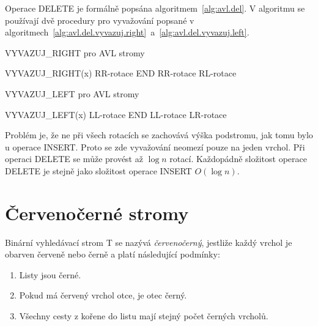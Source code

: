 Operace DELETE je formálně popsána algoritmem~\ref{alg:avl.del}.
V algoritmu se používají dvě procedury pro vyvažování popsané v
algoritmech~\ref{alg:avl.del.vyvazuj.right}~a~\ref{alg:avl.del.vyvazuj.left}.

\begin{algorithm}[!htb]
\caption{VYVAZUJ\_RIGHT pro AVL stromy}
\label{alg:avl.del.vyvazuj.right}
\begin{algorithmic}
\STATE VYVAZUJ\_RIGHT(x)
        \STATE RR-rotace
	\STATE END
\ENDIF        
		\STATE {}
        \STATE RR-rotace
\ELSE
        \STATE RL-rotace
\ENDIF
\end{algorithmic}
\end{algorithm}

\begin{algorithm}[!htb]
\caption{VYVAZUJ\_LEFT pro AVL stromy}
\label{alg:avl.del.vyvazuj.left}
\begin{algorithmic}
\STATE VYVAZUJ\_LEFT(x)
        \STATE LL-rotace
		\STATE {}
        \STATE END             
\ENDIF
{}
        \STATE LL-rotace
\ELSE
        \STATE LR-rotace
\ENDIF
\end{algorithmic}
\end{algorithm}


Problém je, že ne při všech rotacích se zachovává výška podstromu, jak
tomu bylo u operace INSERT. Proto se zde vyvažování neomezí pouze na jeden
vrchol. Při operaci DELETE se může provést až $\log n$ rotací. Každopádně
složitost operace DELETE je stejně jako složitost operace INSERT $O(\log n)$.

\FloatBarrier

\section{Červenočerné stromy}

\begin{defn}
Binární vyhledávací strom T se nazývá \emph{červenočerný}, jestliže každý 
vrchol je obarven červeně nebo černě a platí následující podmínky:
\begin{enumerate}
\item Listy jsou černé.
\item Pokud má červený vrchol otce, je otec černý.
\item Všechny cesty z kořene do listu mají stejný počet černých vrcholů.
\end{enumerate}
\end{defn}

